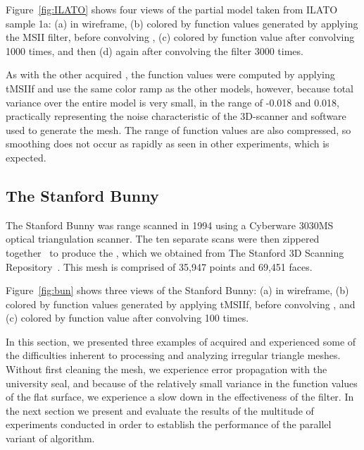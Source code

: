 Figure~\ref{fig:ILATO} shows four views of the partial model taken from \gls{ILATO} sample 1a: (a) in wireframe, (b) colored by function values generated by applying the MSII filter, before convolving , (c) colored by function value after convolving  1000 times, and then (d) again after convolving the filter 3000 times.


As with the other acquired \tdd{}, the function values were computed by applying \gls{tMSIIf} and use the same color ramp as the other models, however, because total variance over the entire model is very small, in the range of -0.018 and 0.018, practically representing the noise characteristic of the 3D-scanner and software used to generate the mesh. The range of function values are also compressed, so smoothing does not occur as rapidly as seen in other experiments, which is expected.

%
%
%
%
\subsection{The Stanford Bunny}
\label{ch6sATDDssSB}
The Stanford Bunny was range scanned in 1994 using a Cyberware 3030MS optical triangulation scanner. The ten separate scans were then zippered together~\cite{Turk94} to produce the \tdd{}, which we obtained from The Stanford 3D Scanning Repository~\cite{StanfordBun}. This mesh is comprised of 35,947 points and 69,451 faces.

Figure~\ref{fig:bun} shows three views of the Stanford Bunny: (a) in wireframe, (b) colored by function values generated by applying \gls{tMSIIf}, before convolving , and (c) colored by function value after convolving  100 times.


In this section, we presented three examples of acquired \tdd{} and experienced some of the difficulties inherent to processing and analyzing irregular triangle meshes. Without first cleaning the mesh, we experience error propagation with the university seal, and because of the relatively small variance in the function values of the flat surface, we experience a slow down in the effectiveness of the filter. In the next section we present and evaluate the results of the multitude of experiments conducted in order to establish the performance of the parallel variant of  algorithm.

%
%
%
%
%
%
